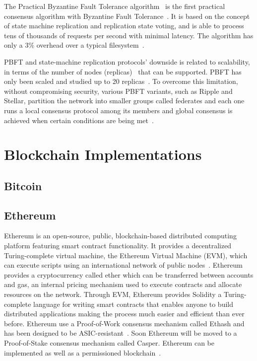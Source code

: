 The Practical Byzantine Fault Tolerance algorithm~\cite{Castro:1999:PBF:296806.296824} is the first practical consensus algorithm with Byzantine Fault Tolerance~\cite{wiki:byzantine_fault_tolerance}.
It is based on the concept of state machine replication and replication state voting, and is able to process tens of thousands of requests per second with minimal latency.
The algorithm has only a 3\% overhead over a typical filesystem~\cite{Castro:1999:PBF:296806.296824}.

PBFT and state-machine replication protocols’ downside is related to scalability, in terms of the number of nodes (replicas)~\cite{Vukolić2016} that can be supported.
PBFT has only been scaled and studied up to 20 replicas~\cite{bl_consensus,Vukolić2016}. To overcome this limitation, without compromising security, various PBFT variants,
such as Ripple and Stellar, partition the network into smaller groups called federates and each one runs a local consensus protocol among its members and
global consensus is achieved when certain conditions are being met~\cite{DBLP:journals/corr/abs-1708-05665}.

\section{Blockchain Implementations}\label{blockchain_implementations}

\subsection{Bitcoin}\label{bltech:impl:bitcoin}
\subsection{Ethereum}\label{bltech:impl:ethereum}

Ethereum is an open-source, public, blockchain-based distributed computing platform featuring smart contract functionality.
It provides a decentralized Turing-complete virtual machine, the Ethereum Virtual Machine (EVM), which can execute scripts using an
international network of public nodes~\cite{wiki:ethereum}. Ethereum provides a cryptocurrency called ether which can be transferred between accounts and gas,
an internal pricing mechanism used to execute contracts and allocate resources on the network. Through EVM, Ethereum provides Solidity a
Turing-complete language for writing smart contracts that enables anyone to build distributed applications making the process much easier and efficient than ever before.
Ethereum use a Proof-of-Work consensus mechanism called Ethash and has been designed to be ASIC-resistant~\cite{ethash}.
Soon Ethereum will be moved to a Proof-of-Stake consensus mechanism called Casper. Ethereum can be implemented as well as a permissioned blockchain~\cite{consortium_chain_development,quorum}.


